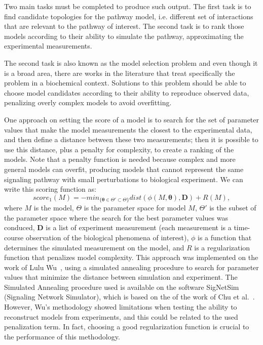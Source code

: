 Two main tasks must be completed to produce such output. The first task
is to find candidate topologies for the pathway model, i.e. different
set of interactions that are relevant to the pathway of interest. The
second task is to rank those models according to their ability to 
simulate the pathway, approximating the experimental measurements.


The second task is also known as the model selection problem and even
though it is a broad area, there are works in the literature that treat 
specifically the problem in a biochemical context. Solutions to this 
problem should be able to choose model candidates according to their 
ability to reproduce observed data, penalizing overly complex models 
to avoid overfitting. 

One approach on setting the score of a model is to search for the set of 
parameter values that make the model measurements the closest to the 
experimental data, and then define a distance between these two 
measurements; then it is possible to use this distance, plus a penalty 
for complexity, to create a ranking of the models. Note that a penalty 
function is needed because complex and more general models can overfit,
producing models that cannot represent the same signaling pathway with
small perturbations to biological experiment. We can write this scoring 
function as:
\begin{equation}
    score_1 (M) = - min_{\{{\boldsymbol \theta} \in \Theta' \subset
        \Theta\}} dist (\phi(M, {\bm \theta}), {\bm D}) + R (M),
\end{equation}
where $M$ is the model, $\Theta$ is the parameter space for model $M$, 
$\Theta'$ is the subset of the parameter space where the search for the
best parameter values was conduced, ${\bm D}$ is a list of experiment
measurement (each measurement is a time-course observation of the
biological phenomena of interest), $\phi$ is a function that determines
the simulated measurement on the model, and $R$ is a regularization
function that penalizes model complexity. This approach was implemented
on the work of Lulu Wu~\cite{Wu15}, using a simulated annealing
procedure to search for parameter values that minimize the distance
between simulation and experiment. The Simulated Annealing procedure
used is available on the software SigNetSim (Signaling Network
Simulator), which is based on the of the work of Chu et al.~\cite{Chu1999}.
However, Wu's methodology showed limitations when testing the ability to
reconstruct models from experiments, and this could be related to the
used penalization term. In fact, choosing a good regularization function
is crucial to the performance of this methodology.

